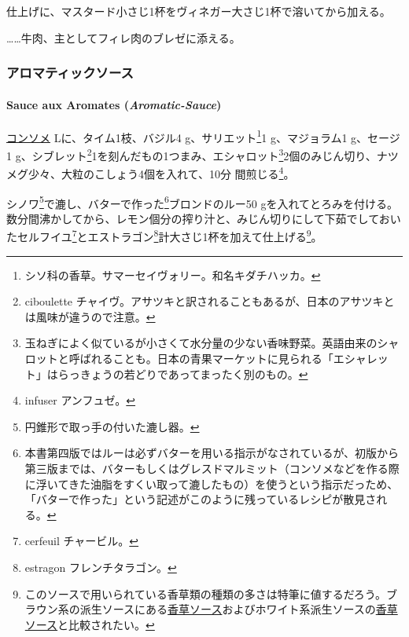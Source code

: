 \begin{recette}
仕上げに、マスタード小さじ1杯をヴィネガー大さじ1杯で溶いてから加える。

\ldots{}\ldots{}牛肉、主としてフィレ肉のブレゼに添える。

\maeaki

\hypertarget{ux30a2ux30edux30deux30c6ux30a3ux30c3ux30afux30bdux30fcux30b9}{%
\subsubsection{アロマティックソース}\label{ux30a2ux30edux30deux30c6ux30a3ux30c3ux30afux30bdux30fcux30b9}}

\hypertarget{aromatic-sauce}{%
\paragraph{\texorpdfstring{Sauce aux Aromates
(\emph{Aromatic-Sauce})}{Sauce aux Aromates (Aromatic-Sauce)}}\label{aromatic-sauce}}

 
 

\protect\hyperlink{}{コンソメ}\undemi{} Lに、タイム1枝、バジル4
g、サリエット\footnote{シソ科の香草。サマーセイヴォリー。和名キダチハッカ。}1
g、マジョラム1 g、セージ1 g、シブレット\footnote{ciboulette
  チャイヴ。アサツキと訳されることもあるが、日本のアサツキとは風味が違うので注意。}1を刻んだもの1つまみ、エシャロット\footnote{玉ねぎによく似ているが小さくて水分量の少ない香味野菜。英語由来のシャロットと呼ばれることも。日本の青果マーケットに見られる「エシャレット」はらっきょうの若どりであってまったく別のもの。}2個のみじん切り、ナツメグ少々、大粒のこしょう4個を入れて、10分
間煎じる\footnote{infuser アンフュゼ。}。

シノワ\footnote{円錐形で取っ手の付いた漉し器。}で漉し、バターで作った\footnote{本書第四版ではルーは必ずバターを用いる指示がなされているが、初版から第三版までは、バターもしくはグレスドマルミット（コンソメなどを作る際に浮いてきた油脂をすくい取って漉したもの）を使うという指示だっため、「バターで作った」という記述がこのように残っているレシピが散見される。}ブロンドのルー50
gを入れてとろみを付ける。数分間沸かしてから、レモン\undemi{}個分の搾り汁と、みじん切りにして下茹でしておいたセルフイユ\footnote{cerfeuil
  チャービル。}とエストラゴン\footnote{estragon フレンチタラゴン。}計大さじ1杯を加えて仕上げる\footnote{このソースで用いられている香草類の種類の多さは特筆に値するだろう。ブラウン系の派生ソースにある\protect\hyperlink{sauce-aux-fines-herbes}{香草ソース}およびホワイト系派生ソースの\protect\hyperlink{sauce-aux-fines-herbes-blanche}{香草ソース}と比較されたい。}。


\end{recette}
